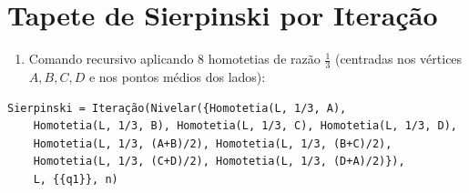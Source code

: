 \documentclass[12pt,a4paper]{report}
\begin{document}
	\section{Tapete de Sierpinski por Iteração}
	\begin{enumerate}[resume]
		\item Comando recursivo aplicando 8 homotetias de razão $\frac{1}{3}$ (centradas nos vértices $A, B, C, D$ e nos pontos médios dos lados):
	\end{enumerate}
	\begin{destaque}
		\begin{verbatim}
Sierpinski = Iteração(Nivelar({Homotetia(L, 1/3, A), 
    Homotetia(L, 1/3, B), Homotetia(L, 1/3, C), Homotetia(L, 1/3, D),
    Homotetia(L, 1/3, (A+B)/2), Homotetia(L, 1/3, (B+C)/2), 
    Homotetia(L, 1/3, (C+D)/2), Homotetia(L, 1/3, (D+A)/2)}), 
    L, {{q1}}, n)
		\end{verbatim}
	\end{destaque}
\end{document}
